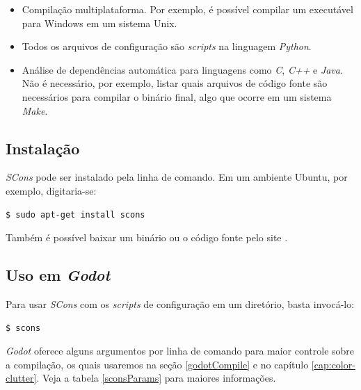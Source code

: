 \begin{itemize}
\item Compilação multiplataforma. Por exemplo, é possível compilar um executável para Windows em um sistema Unix.

\item Todos os arquivos de configuração são \textit{scripts} na linguagem \textit{Python}.

\item Análise de dependências automática para linguagens como \textit{C}, \textit{C++} e \textit{Java}. Não é necessário, por exemplo, listar quais arquivos de código fonte são necessários para compilar o binário final, algo que ocorre em um sistema \textit{Make}.
\end{itemize}


\subsection{Instalação}

\textit{SCons} pode ser instalado pela linha de comando. Em um ambiente Ubuntu, por exemplo, digitaria-se:

\begin{lstlisting}[language=Bash]
$ sudo apt-get install scons
\end{lstlisting}

Também é possível baixar um binário ou o código fonte pelo site \citep{sconsDownload}.


\subsection{Uso em \textit{Godot}}

Para usar \textit{SCons} com os \textit{scripts} de configuração em um diretório, basta invocá-lo:

\begin{lstlisting}[language=Bash]
$ scons
\end{lstlisting}

\textit{Godot} oferece alguns argumentos por linha de comando para maior controle sobre a compilação, os quais usaremos na seção \ref{godotCompile} e no capítulo \ref{cap:color-clutter}. Veja a tabela \ref{sconsParams} para maiores informações.

